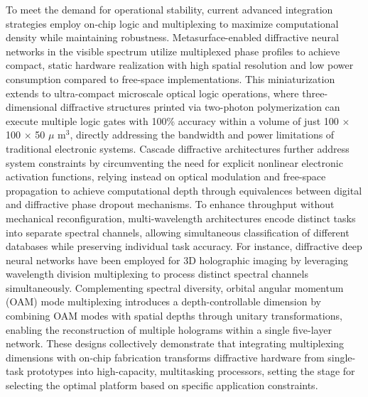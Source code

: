 To meet the demand for operational stability, current advanced integration strategies employ on-chip logic and multiplexing to maximize computational density while maintaining robustness. Metasurface-enabled diffractive neural networks in the visible spectrum utilize multiplexed phase profiles to achieve compact, static hardware realization with high spatial resolution and low power consumption compared to free-space implementations. This miniaturization extends to ultra-compact microscale optical logic operations, where three-dimensional diffractive structures printed via two-photon polymerization can execute multiple logic gates with 100\% accuracy within a volume of just 100 \(\times\) 100 \(\times\) 50 \(\mu\) m\(^{3}\), directly addressing the bandwidth and power limitations of traditional electronic systems. Cascade diffractive architectures further address system constraints by circumventing the need for explicit nonlinear electronic activation functions, relying instead on optical modulation and free-space propagation to achieve computational depth through equivalences between digital and diffractive phase dropout mechanisms. To enhance throughput without mechanical reconfiguration, multi-wavelength architectures encode distinct tasks into separate spectral channels, allowing simultaneous classification of different databases while preserving individual task accuracy. For instance, diffractive deep neural networks have been employed for 3D holographic imaging by leveraging wavelength division multiplexing to process distinct spectral channels simultaneously. \citep{doi_10_1109_acp_ipoc63121_2024_10809872_a7935774} Complementing spectral diversity, orbital angular momentum (OAM) mode multiplexing introduces a depth-controllable dimension by combining OAM modes with spatial depths through unitary transformations, enabling the reconstruction of multiple holograms within a single five-layer network. These designs collectively demonstrate that integrating multiplexing dimensions with on-chip fabrication transforms diffractive hardware from single-task prototypes into high-capacity, multitasking processors, setting the stage for selecting the optimal platform based on specific application constraints. \citep{doi_10_3390_mi16010008_4be72643} \citep{doi_10_1021_acsphotonics_5c02472_283a8bea} \citep{doi_10_1515_nanoph_2022_0615_9a3be8d6} \citep{doi_10_1364_oe_447337_61ffab71} \citep{doi_10_1364_ol_428761_f1f67ac8}

